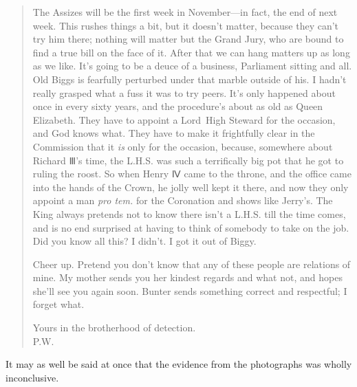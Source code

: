 \begin{quotation}
The Assizes will be the first week in November—in fact, the end of next week. This rushes things a bit, but it doesn't matter, because they can't try him there; nothing will matter but the Grand Jury, who are bound to find a true bill on the face of it. After that we can hang matters up as long as we like. It's going to be a deuce of a business, Parliament sitting and all. Old Biggs is fearfully perturbed under that marble outside of his. I hadn't really grasped what a fuss it was to try peers. It's only happened about once in every sixty years, and the procedure's about as old as Queen Elizabeth. They have to appoint a Lord~High Steward for the occasion, and God knows what. They have to make it frightfully clear in the Commission that it \textit{is} only for the occasion, because, somewhere about Richard Ⅲ's time, the L.H.S. was such a terrifically big pot that he got to ruling the roost. So when Henry Ⅳ came to the throne, and the office came into the hands of the Crown, he jolly well kept it there, and now they only appoint a man \textit{pro tem.} for the Coronation and shows like Jerry's. The King always pretends not to know there isn't a L.H.S. till the time comes, and is no end surprised at having to think of somebody to take on the job. Did you know all this? I didn't. I got it out of Biggy.

Cheer up. Pretend you don't know that any of these people are relations of mine. My mother sends you her kindest regards and what not, and hopes she'll see you again soon. Bunter sends something correct and respectful; I forget what.

\begin{flushright}
Yours in the brotherhood of detection.\\
\textsc{P.W.}
\end{flushright}
\end{quotation}
It may as well be said at once that the evidence from the photographs was wholly inconclusive.
